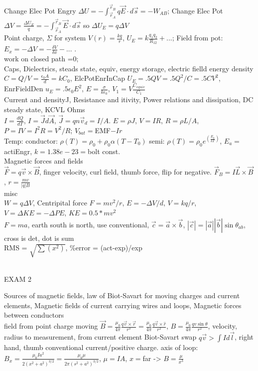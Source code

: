 \documentclass{article}
\begin{document}
\begin{large}
\\Change Elec Pot Engry $\Delta U=-\int_{\vec{r}_A}^{\vec{r}_B} q\vec{E}\cdot d\vec{s}=-W_{AB}$; Change Elec Pot $\Delta V =\frac{\Delta U_E}{q}= -\int_{\vec{r}_A}^{\vec{r}_B} \vec{E}\cdot d\vec{s}$ so $\Delta U_E = q\Delta V$
\\Point charge, $\Sigma$ for system $V(r)=\frac{kq}{r}$, $U_E=k\frac{q_1q_2}{R_{12}}+$...; Field from pot: $E_x=-\Delta V=-\frac{\delta V}{\delta x}-$... .
\\work on closed path =0; 
\\\indent Caps, Dielectrics, steads state, equiv, energy storage, electric fielld energy density
\\$C=Q/V=\frac{\epsilon_0 A}{d}=kC_0$, ElcPotEnrInCap $U_E=.5 Q V =.5 Q^2/C = .5 C V^2$, EnrFieldDen $u_E=.5 \epsilon_0 E^2$, $E=\frac{\sigma}{k\epsilon_0}$, $V_1=V\frac{C_{equiv}}{C_1}$
\\\indent Current and densityJ, Resistance and itivity, Power relations and dissipation, DC steady state, KCVL Ohms
\\$I=\frac{dQ}{dT}$, $I=\vec J d\vec A$, $\vec J=q n \vec v_d=I/A$. $E=\rho J$, $V=IR$, $R=\rho L/A$, $P=IV=I^2R=V^2/R$; $V_{bat}=$EMF$-Ir$
\\Temp: conductor: $\rho(T)=\rho_0+\rho_0\alpha(T-T_0)$ semi: $\rho(T)=\rho_0e^{(\frac {E_a}{kT})}$, $E_a=$ actiEngr, $k=1.38e-23=$bolt const.
\\\indent Magnetic forces and fields
\\$\vec{F}=q \vec v \times \vec B$, finger velocity, curl field, thumb force, flip for negative. $\vec F_B=I \vec L \times \vec B$, $r=\frac{mv}{|q|B}$
\\\indent misc
\\$W=q\Delta V$, Centripital force $F=mv^2/r$, $E=-\Delta V/d$, $V=kq/r$, $V=\Delta KE=-\Delta PE$, $KE=0.5*mv^2$
\\$F=ma$, earth south is north, use conventional, $\vec c=\vec a \times\vec b$, $|\vec c|=|\vec a| |\vec b|\sin\theta_{ab}$, cross is det, dot is sum
\\RMS = $\sqrt{\sum(x^2)}$, \%error = (act-exp)/exp
\begin{Large}\\EXAM 2\end{Large}
\indent Sources of magnetic fields, law of Biot-Savart for moving charges and current elements, Magnetic fields of current carrying wires and loops, Magnetic forces between conductors
\\field from point charge moving $\vec B=\frac{\mu_0}{4\pi} \frac{q\vec v\times\vec r}{r^3}=\frac{\mu_0}{4\pi} \frac{q\vec v\times\hat r}{r^2}$, $B=\frac{\mu_0}{4\pi}\frac{qv\sin\theta}{r^2}$, velocity, radius to measurement, from current element Biot-Savart swap $q\vec v>\int Id\vec l$, right hand, thumb conventional current/positive charge. axis of loop: $B_x=\frac{\mu_0Ia^2}{2(x^2+a^2)^{3/2}}=\frac{\mu_0\mu}{2\pi(s^2+a^2)^{3/2}}$, $\mu=IA$, $x=$far -> $B=\frac{\mu}{x^3}$

\end{large}
\end{document}

